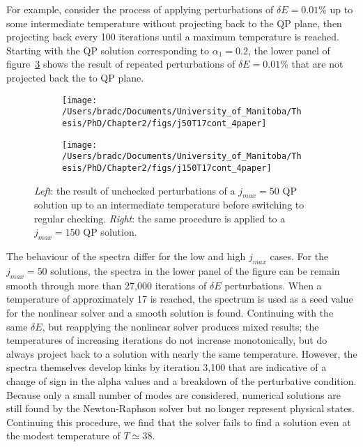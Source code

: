 \documentclass[../PhD.tex]{subfiles}
\begin{document}
\begin{subappendices}
For example, consider the process of applying perturbations of $\delta E = 0.01\%$ up to some intermediate temperature without projecting back to the QP plane, then projecting back every 100 iterations until a maximum temperature is reached. Starting with the QP solution corresponding to $\alpha_1 = 0.2$, the lower panel of figure~\ref{fig: reop check} shows the result of repeated perturbations of $\delta E = 0.01\%$ that are not projected back the to QP plane.

\begin{figure}[h]
	\centering
	\begin{subfigure}[t]{0.48\textwidth}
		\texttt{[image: /Users/bradc/Documents/University\_of\_Manitoba/Thesis/PhD/Chapter2/figs/j50T17cont\_4paper]}
		\label{fig: reop check j50}
	\end{subfigure}
	\;
	\begin{subfigure}[t]{0.48\textwidth}
		\texttt{[image: /Users/bradc/Documents/University\_of\_Manitoba/Thesis/PhD/Chapter2/figs/j150T17cont\_4paper]}
		\label{fig: reop check j150}
	\end{subfigure}
\caption{{\it Left}: the result of unchecked perturbations of a $j_{max} = 50$ QP solution up to an intermediate temperature before switching to regular checking. {\it Right}: the same procedure is applied to a $j_{max}=150$ QP solution.}
\label{fig: reop check}
\end{figure}

The behaviour of the spectra differ for the low and high $j_{max}$ cases. For the $j_{max}=50$ solutions, the spectra in the lower panel of the figure can be remain smooth through more than 27,000 iterations of $\delta E$ perturbations. When a temperature of approximately 17 is reached, the spectrum is used as a seed value for the nonlinear solver and a smooth solution is found. Continuing with the same $\delta E$, but reapplying the nonlinear solver produces mixed results; the temperatures of increasing iterations do not increase monotonically, but do always project back to a solution with nearly the same temperature. However, the spectra themselves develop kinks by iteration 3,100 that are indicative of a change of sign in the alpha values and a breakdown of the perturbative condition. Because only a small number of modes are considered, numerical solutions are still found by the Newton-Raphson solver but no longer represent physical states. Continuing this procedure, we find that the solver fails to find a solution even at the modest temperature of $T \simeq 38$.


\end{subappendices}
\end{document}
